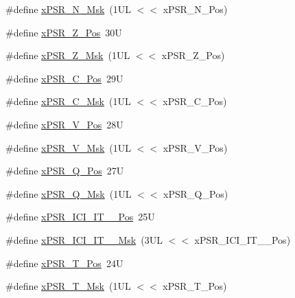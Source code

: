 \begin{DoxyCompactItemize}
\item 
\#define \hyperlink{group___c_m_s_i_s___c_o_r_e_gaf600f4ff41b62cf2f3b0a59b6d2e93d6}{x\+P\+S\+R\+\_\+\+N\+\_\+\+Msk}~(1\+U\+L $<$$<$ x\+P\+S\+R\+\_\+\+N\+\_\+\+Pos)
\item 
\#define \hyperlink{group___c_m_s_i_s___c_o_r_e_ga5869dd608eea73c80f0567d781d2230b}{x\+P\+S\+R\+\_\+\+Z\+\_\+\+Pos}~30U
\item 
\#define \hyperlink{group___c_m_s_i_s___c_o_r_e_ga907599209fba99f579778e662021c4f2}{x\+P\+S\+R\+\_\+\+Z\+\_\+\+Msk}~(1\+U\+L $<$$<$ x\+P\+S\+R\+\_\+\+Z\+\_\+\+Pos)
\item 
\#define \hyperlink{group___c_m_s_i_s___c_o_r_e_ga14adb79b91f6634b351a1b57394e2db6}{x\+P\+S\+R\+\_\+\+C\+\_\+\+Pos}~29U
\item 
\#define \hyperlink{group___c_m_s_i_s___c_o_r_e_ga21e2497255d380f956ca0f48d11d0775}{x\+P\+S\+R\+\_\+\+C\+\_\+\+Msk}~(1\+U\+L $<$$<$ x\+P\+S\+R\+\_\+\+C\+\_\+\+Pos)
\item 
\#define \hyperlink{group___c_m_s_i_s___c_o_r_e_gae0cfbb394490db402623d97e6a979e00}{x\+P\+S\+R\+\_\+\+V\+\_\+\+Pos}~28U
\item 
\#define \hyperlink{group___c_m_s_i_s___c_o_r_e_gab07f94ed3b6ee695f5af719dc27995c2}{x\+P\+S\+R\+\_\+\+V\+\_\+\+Msk}~(1\+U\+L $<$$<$ x\+P\+S\+R\+\_\+\+V\+\_\+\+Pos)
\item 
\#define \hyperlink{group___c_m_s_i_s___c_o_r_e_gaabb4178d50676a8f19cf8f727f38ace8}{x\+P\+S\+R\+\_\+\+Q\+\_\+\+Pos}~27U
\item 
\#define \hyperlink{group___c_m_s_i_s___c_o_r_e_ga133ac393c38559ae43ac36383e731dd4}{x\+P\+S\+R\+\_\+\+Q\+\_\+\+Msk}~(1\+U\+L $<$$<$ x\+P\+S\+R\+\_\+\+Q\+\_\+\+Pos)
\item 
\#define \hyperlink{group___c_m_s_i_s___c_o_r_e_gaffb36d1bb0280b1caafcf9b00f6a6da0}{x\+P\+S\+R\+\_\+\+I\+C\+I\+\_\+\+I\+T\+\_\+\_\+\+Pos}~25U
\item 
\#define \hyperlink{group___c_m_s_i_s___c_o_r_e_gaa47c89b028499f8d9ebe6d554439a2b3}{x\+P\+S\+R\+\_\+\+I\+C\+I\+\_\+\+I\+T\+\_\+\_\+\+Msk}~(3\+U\+L $<$$<$ x\+P\+S\+R\+\_\+\+I\+C\+I\+\_\+\+I\+T\+\_\+\_\+\+Pos)
\item 
\#define \hyperlink{group___c_m_s_i_s___c_o_r_e_ga98d801da9a49cda944f52aeae104dd38}{x\+P\+S\+R\+\_\+\+T\+\_\+\+Pos}~24U
\item 
\#define \hyperlink{group___c_m_s_i_s___c_o_r_e_ga30ae2111816e82d47636a8d4577eb6ee}{x\+P\+S\+R\+\_\+\+T\+\_\+\+Msk}~(1\+U\+L $<$$<$ x\+P\+S\+R\+\_\+\+T\+\_\+\+Pos)
\item 
$$
\end{DoxyCompactItemize}
